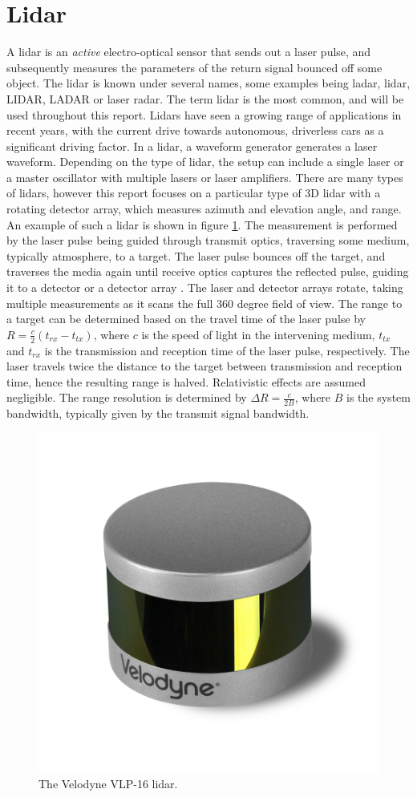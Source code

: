 \section{Lidar}
A lidar is an \textit{active} electro-optical sensor that sends out a laser pulse, and subsequently measures the parameters of the return signal bounced off some object. The lidar is known under several names, some examples being ladar, lidar, LIDAR, LADAR or laser radar. The term lidar is the most common, and will be used throughout this report. Lidars have seen a growing range of applications in recent years, with the current drive towards autonomous, driverless cars as a significant driving factor. In a lidar, a waveform generator generates a laser waveform. Depending on the type of lidar, the setup can include a single laser or a master oscillator with multiple lasers or laser amplifiers. There are many types of lidars, however this report focuses on a particular type of 3D lidar with a rotating detector array, which measures azimuth and elevation angle, and range. An example of such a lidar is shown in figure \ref{fig:vlp_16}. The measurement is performed by the laser pulse being guided through transmit optics, traversing some medium, typically atmosphere, to a target. The laser pulse bounces off the target, and traverses the media again until receive optics captures the reflected pulse, guiding it to a detector or a detector array \cite{SpieLidar}. The laser and detector arrays rotate, taking multiple measurements as it scans the full 360 degree field of view. The range to a target can be determined based on the travel time of the laser pulse by $R=\frac{c}{2}(t_{rx}-t_{tx})$, where $c$ is the speed of light in the intervening medium, $t_{tx}$ and $t_{rx}$ is the transmission and reception time of the laser pulse, respectively. The laser travels twice the distance to the target between transmission and reception time, hence the resulting range is halved. Relativistic effects are assumed negligible. The range resolution is determined by $\Delta R=\frac{c}{2B}$, where $B$ is the system bandwidth, typically given by the transmit signal bandwidth.
\begin{figure}[H]
    \centering
    \includegraphics[width=.7\linewidth]{fig/Velodyne_LiDAR_Puck_VLP-16_Left_900.png}
    \caption{The Velodyne VLP-16 lidar.}
    \label{fig:vlp_16}
\end{figure}
